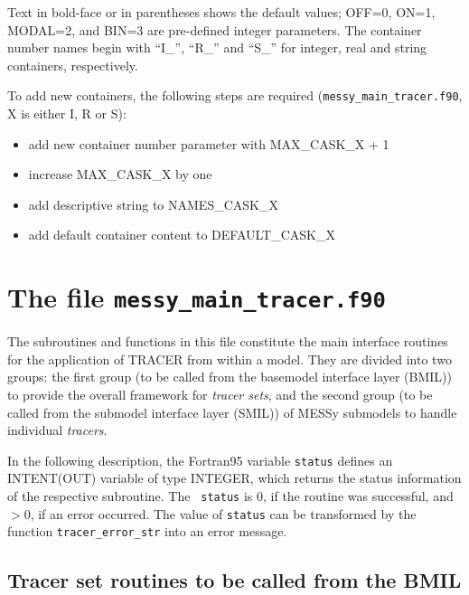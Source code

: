 \documentclass[twoside]{article}
\begin{document}
Text in bold-face or in parentheses shows the default values; 
OFF=0, ON=1, MODAL=2, and BIN=3 are pre-defined integer parameters.
The container number names begin with ``I\_'', ``R\_'' and ``S\_'' for
integer, real and string containers, respectively.

To add new containers, the following steps are required
({\tt messy\_main\_tracer.f90}, X is either I, R or S):
%
\begin{itemize} 
 \item add new container number parameter with MAX\_CASK\_X + 1
 \item increase MAX\_CASK\_X by one
 \item add descriptive string to NAMES\_CASK\_X
 \item add default container content to DEFAULT\_CASK\_X
\end{itemize}

\section{The file {\tt messy\_main\_tracer.f90}}
\label{sec:tracermain}
%
The subroutines and functions in this file constitute the main interface
routines for the application of TRACER from within a model. They are divided
into two groups: the first group (to be called from the basemodel interface
layer (BMIL)) to provide the overall framework for {\it tracer sets}, and the
second group (to be called from the submodel interface layer (SMIL)) of MESSy
submodels to handle individual {\it tracers}.

In the following description, the Fortran95 variable {\tt status}
defines an INTENT(OUT) variable of type INTEGER, which
returns the status information of the respective subroutine. The {\tt
status} is $0$, if the routine was successful, and $>0$, if an error
occurred. The value of {\tt status} can be transformed by the
function {\tt tracer\_error\_str} into an error message.

\subsection{Tracer set routines to be called from the BMIL}
\label{sec:tracer_set}

\end{document}
